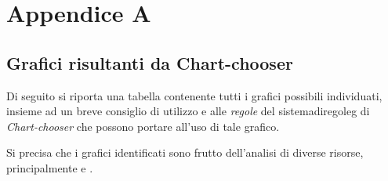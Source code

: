 \chapter{Appendice A}\label{cap:appendix}

\section{Grafici risultanti da Chart-chooser}
Di seguito si riporta una tabella contenente tutti i grafici possibili individuati, insieme ad un breve consiglio 
di utilizzo e alle \emph{regole} del \gls{sistemadiregoleg} di \emph{Chart-chooser} che possono portare all'uso 
di tale grafico. 

Si precisa che i grafici identificati sono frutto dell'analisi di diverse risorse, principalmente \cite{site:data-to-viz} e \cite{site:vis_vocabulary}.

